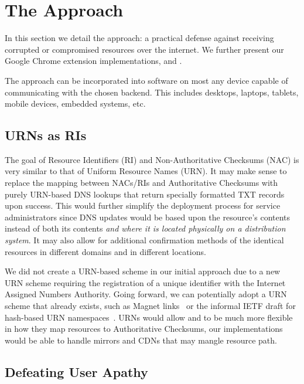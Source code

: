 \section{The \SYSTEM{} Approach} \label{sec:approach}

In this section we detail the \SYSTEM{} approach: a practical defense against
receiving corrupted or compromised resources over the internet. We further
present our Google Chrome extension implementations, \DNSSYS{} and \DHTSYS{}.

The \SYSTEM{} approach can be incorporated into
software on most any device capable of communicating with the chosen backend.
This includes desktops, laptops, tablets, mobile devices, embedded systems, etc.


\subsection{URNs as RIs}


The goal of Resource Identifiers (RI) and Non-Authoritative Checksums (NAC) is
very similar to that of Uniform Resource Names (URN). It may make sense to
replace the mapping between NACs/RIs and Authoritative Checksums with purely
URN-based DNS lookups that return specially formatted TXT records upon success.
This would further simplify the deployment process for service administrators
since DNS updates would be based upon the resource's contents instead of both
its contents \textit{and where it is located physically on a distribution
system}. It may also allow for additional confirmation methods of the identical
resources in different domains and in different locations.

We did not create a URN-based scheme in our initial approach due to a new URN
scheme requiring the registration of a unique identifier with the Internet
Assigned Numbers Authority. Going forward, we can potentially adopt a URN scheme
that already exists, such as Magnet links~\cite{MagnetLinks} or the informal
IETF draft for hash-based URN namespaces~\cite{draft-URN}. URNs would allow
\DNSSYS{} and \DHTSYS{} to be much more flexible in how they map resources to
Authoritative Checksums, \ie our implementations would be able to handle mirrors
and CDNs that may mangle resource path.

\subsection{Defeating User Apathy}

